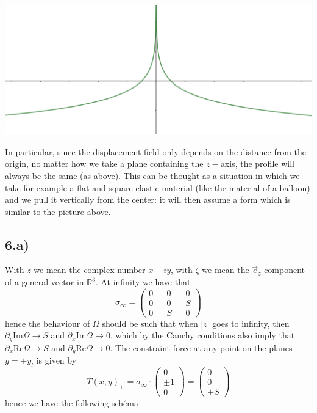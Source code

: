 \documentclass[10pt,a4paper]{book}
\begin{document}
\includegraphics[scale=0.5]{DM1}


In particular, since the displacement field only depends on the distance from the origin, no matter how we take a plane containing the $z-$axis, the profile will always be the same (as above). This can be thought as a situation in which we take for example a flat and square elastic material (like the material of a balloon) and we pull it vertically from the center: it will then assume a form which is similar to the picture above.

\subsection*{6.a)}
With $z$ we mean the complex number $x+iy$, with $\zeta$ we mean the $\vec{e}_z$ component of a general vector in $\mathbb{R}^3$.
At infinity we have that  $$\sigma_{\infty}=\begin{pmatrix}
0 && 0 && 0\\
0 && 0 && S\\
0 && S && 0
\end{pmatrix}$$
hence the behaviour of $\Omega$ should be such that when $|z|$ goes to infinity, then $\partial_y\text{Im}\Omega\to S$ and $\partial_x\text{Im}\Omega\to 0$, which by the Cauchy conditions also imply that 
$\partial_x\text{Re}\Omega\to S$ and $\partial_y\text{Re}\Omega\to 0$.
The constraint force at any point on the planes $y=\pm y_l$ is given by 
$$T(x,y)_{\pm}=\sigma_{\infty}\cdot \begin{pmatrix}
0\\
\pm1\\
0
\end{pmatrix}=\begin{pmatrix}
0\\
0\\
\pm S
\end{pmatrix}$$hence we have the following schéma
\end{document}
